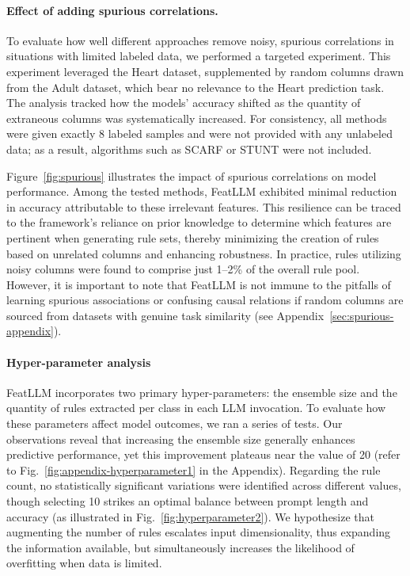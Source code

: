 \vspace*{-0.12in}
\paragraph{Effect of adding spurious correlations.} To evaluate how well different approaches remove noisy, spurious correlations in situations with limited labeled data, we performed a targeted experiment. This experiment leveraged the Heart dataset, supplemented by random columns drawn from the Adult dataset, which bear no relevance to the Heart prediction task. The analysis tracked how the models' accuracy shifted as the quantity of extraneous columns was systematically increased. For consistency, all methods were given exactly 8 labeled samples and were not provided with any unlabeled data; as a result, algorithms such as SCARF or STUNT were not included.

Figure~\ref{fig:spurious} illustrates the impact of spurious correlations on model performance. Among the tested methods, \textsf{FeatLLM} exhibited minimal reduction in accuracy attributable to these irrelevant features. This resilience can be traced to the framework’s reliance on prior knowledge to determine which features are pertinent when generating rule sets, thereby minimizing the creation of rules based on unrelated columns and enhancing robustness. In practice, rules utilizing noisy columns were found to comprise just 1--2\% of the overall rule pool. However, it is important to note that \textsf{FeatLLM} is not immune to the pitfalls of learning spurious associations or confusing causal relations if random columns are sourced from datasets with genuine task similarity (see Appendix~\ref{sec:spurious-appendix}).

\vspace*{-0.12in}
\paragraph{Hyper-parameter analysis}
\textsf{FeatLLM} incorporates two primary hyper-parameters: the ensemble size and the quantity of rules extracted per class in each LLM invocation. To evaluate how these parameters affect model outcomes, we ran a series of tests. Our observations reveal that increasing the ensemble size generally enhances predictive performance, yet this improvement plateaus near the value of 20 (refer to Fig.~\ref{fig:appendix-hyperparameter1} in the Appendix). Regarding the rule count, no statistically significant variations were identified across different values, though selecting 10 strikes an optimal balance between prompt length and accuracy (as illustrated in Fig.~\ref{fig:hyperparameter2}). We hypothesize that augmenting the number of rules escalates input dimensionality, thus expanding the information available, but simultaneously increases the likelihood of overfitting when data is limited.

